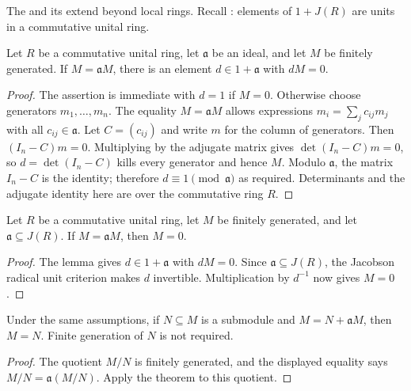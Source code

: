 The  and its  extend beyond local rings. Recall : elements of $1+J(R)$ are units in a commutative unital ring.

\begin{lemma}\label{lem-determinant-annihilator}
Let $R$ be a commutative unital ring, let $\mathfrak a$ be an ideal, and let $M$ be finitely generated. If $M=\mathfrak aM$, there is an element $d\in1+\mathfrak a$ with $dM=0$.
\end{lemma}
\begin{proof}\label{proof-determinant-annihilator}
The assertion is immediate with $d=1$ if $M=0$. Otherwise choose generators $m_1,\ldots,m_n$. The equality $M=\mathfrak aM$ allows expressions $m_i=\sum_jc_{ij}m_j$ with all $c_{ij}\in\mathfrak a$. Let $C=(c_{ij})$ and write $m$ for the column of generators. Then $(I_n-C)m=0$. Multiplying by the adjugate matrix gives $\det(I_n-C)m=0$, so $d=\det(I_n-C)$ kills every generator and hence $M$. Modulo $\mathfrak a$, the matrix $I_n-C$ is the identity; therefore $d\equiv1\pmod{\mathfrak a}$ as required. Determinants and the adjugate identity here are over the commutative ring $R$.
\end{proof}

\begin{theorem}\label{thm-general-nakayama}
Let $R$ be a commutative unital ring, let $M$ be finitely generated, and let $\mathfrak a\subseteq J(R)$. If $M=\mathfrak aM$, then $M=0$.
\end{theorem}
\begin{proof}\label{proof-general-nakayama}
The lemma gives $d\in1+\mathfrak a$ with $dM=0$. Since $\mathfrak a\subseteq J(R)$, the Jacobson radical unit criterion makes $d$ invertible. Multiplication by $d^{-1}$ now gives $M=0$.
\end{proof}

\begin{corollary}\label{cor-nakayama-quotient}
Under the same assumptions, if $N\subseteq M$ is a submodule and $M=N+\mathfrak aM$, then $M=N$. Finite generation of $N$ is not required.
\end{corollary}
\begin{proof}\label{proof-nakayama-quotient}
The quotient $M/N$ is finitely generated, and the displayed equality says $M/N=\mathfrak a(M/N)$. Apply the theorem to this quotient.
\end{proof}

